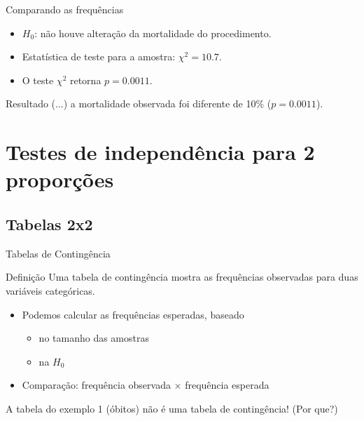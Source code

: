 \documentclass{beamer}
\begin{document}
\begin{frame}{\scriptsize Comparando as frequências}
  \begin{itemize}
    \footnotesize
  \item $H_0$: não houve alteração da mortalidade do procedimento.
  \item Estatística de teste para a amostra: $\chi^2 = 10.7$.
  \item O teste $\chi^2$ retorna $p=0.0011$.
  \end{itemize}
  \bigskip
  \begin{block}{Resultado}
    \small
    (...) a mortalidade observada foi diferente de 10\% ($p=0.0011$).
  \end{block}
\end{frame}

\section[2 amostras]{Testes de independência para 2 proporções}

\subsection{Tabelas 2x2}

\begin{frame}{\scriptsize Tabelas de Contingência}
  \begin{block}{Definição}
    \footnotesize
    Uma \alert{tabela de contingência} mostra as frequências
    observadas para duas variáveis categóricas.
  \end{block}
  \bigskip
  \begin{itemize}
    \footnotesize
  \item Podemos calcular as frequências esperadas, baseado
    \begin{itemize}
      \scriptsize
    \item no tamanho das amostras
    \item na $H_0$
    \end{itemize}
  \item Comparação: frequência observada $\times$ frequência esperada
  \end{itemize}
  \bigskip
  \begin{block}{}
    \footnotesize
    A tabela do exemplo 1 (óbitos) \alert{não é} uma tabela de contingência! (Por que?)
  \end{block}
\end{frame}
\end{document}
